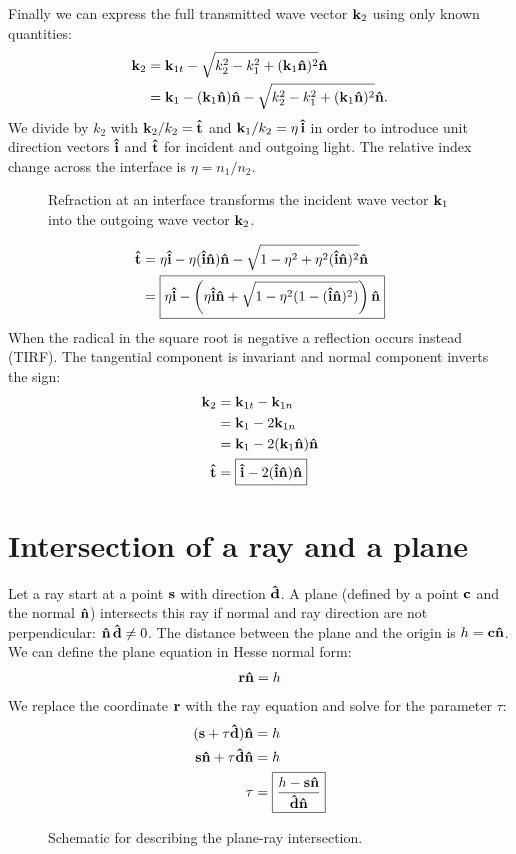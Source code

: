 Finally we can express the full transmitted wave vector $\mathbf{k}_2$ using
only known quantities:
\begin{align}
  \mathbf{k}_2&=\mathbf{k}_{1t}-\sqrt{k_2^2-k_1^2+(\mathbf{k}_1\mathbf{\hat{n}})^2}\mathbf{\hat{n}}\\
  &=\mathbf{k}_1-(\mathbf{k}_1\mathbf{\hat{n}})\mathbf{\hat{n}}-\sqrt{k_2^2-k_1^2+(\mathbf{k}_1\mathbf{\hat{n}})^2}\mathbf{\hat{n}}.
\end{align}
We divide by $k_2$ with $\mathbf{k}_2/k_2=\mathbf{\hat{t}}$ and $\mathbf{k}_1/k_2=\eta\,\mathbf{\hat{i}}$ in order
to introduce unit direction vectors $\mathbf{\hat{i}}$ and $\mathbf{\hat{t}}$ for incident and
outgoing light. The relative index change across the interface is
$\eta=n_1/n_2$.
\begin{figure}
  \centering
  
  \caption{Refraction at an interface transforms the incident wave
    vector $\mathbf{k}_1$ into the outgoing wave vector $\mathbf{k}_2$.}
\end{figure}
\begin{align}
  \mathbf{\hat{t}}&=\eta\mathbf{\hat{i}}-\eta(\mathbf{\hat{i}}\mathbf{\hat{n}})\mathbf{\hat{n}}-\sqrt{1-\eta^2+\eta^2(\mathbf{\hat{i}}\mathbf{\hat{n}})^2}\mathbf{\hat{n}}\\
  &=\boxed{\eta\mathbf{\hat{i}}-\left(\eta\mathbf{\hat{i}}\mathbf{\hat{n}}+\sqrt{1-\eta^2(1-(\mathbf{\hat{i}}\mathbf{\hat{n}})^2)}\right)\mathbf{\hat{n}}}
\end{align}
When the radical in the square root is negative a reflection occurs
instead (TIRF). The tangential component is invariant and normal
component inverts the sign:
 \begin{align}
   \mathbf{k}_2&=\mathbf{k}_{1t}-\mathbf{k}_{1n}\\
   &=\mathbf{k}_1 - 2\mathbf{k}_{1n}\\
   &=\mathbf{k}_1-2(\mathbf{k}_1\mathbf{\hat{n}})\mathbf{\hat{n}}\\
   \mathbf{\hat{t}}&=\boxed{\mathbf{\hat{i}}-2(\mathbf{\hat{i}}\mathbf{\hat{n}})\mathbf{\hat{n}}}
 \end{align}
\section{Intersection of a ray and a plane}
Let a ray start at a point $\mathbf{s}$ with direction $\mathbf{\hat{d}}$.  A plane
(defined by a point $\mathbf{c}$ and the normal $\mathbf{\hat{n}}$) intersects this ray if
normal and ray direction are not perpendicular: $\mathbf{\hat{n}}\,\mathbf{\hat{d}}\not=0$. The
distance between the plane and the origin is $h=\mathbf{c}\mathbf{\hat{n}}$. We can define
the plane equation in Hesse normal form:
\begin{align}
  \mathbf{r}\mathbf{\hat{n}}=h
\end{align}
We replace the coordinate $\mathbf{r}$ with the ray equation and solve for
the parameter $\tau$:
\begin{align}
  (\mathbf{s}+\tau\mathbf{\hat{d}})\mathbf{\hat{n}}&=h\\
  \mathbf{s}\mathbf{\hat{n}}+\tau\mathbf{\hat{d}}\mathbf{\hat{n}}&=h\\
  \tau&=\boxed{\frac{h-\mathbf{s}\mathbf{\hat{n}}}{\mathbf{\hat{d}}\mathbf{\hat{n}}}}
\end{align}
 \begin{figure}[!hbt]
   \centering
   
   \caption{Schematic for describing the plane-ray intersection.}
 \end{figure}
